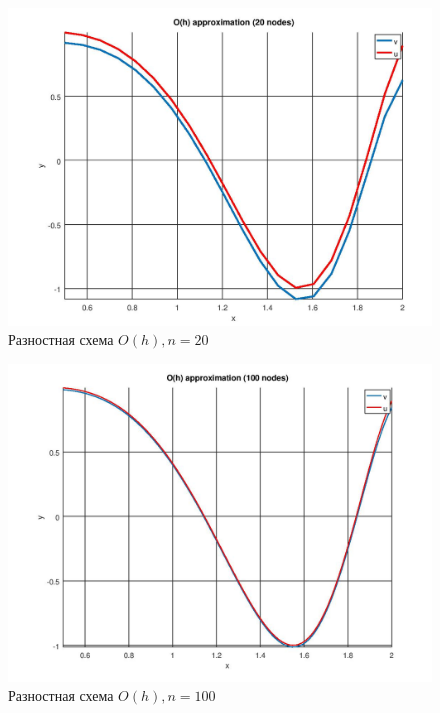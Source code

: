 \documentclass[12pt]{article}
\begin{document}
\begin{figure}
\begin{center}
\includegraphics[scale = 0.65]{h1_20.jpg} 
\end{center}
\caption{Разностная схема $O(h), n = 20$ }
\end{figure}

\begin{figure}
\begin{center}
\includegraphics[scale = 0.65]{h1_100.jpg} 
\end{center}
\caption{Разностная схема $O(h), n = 100$}
\end{figure}


\pagebreak
\end{document}

